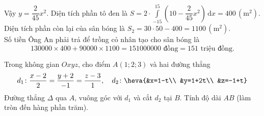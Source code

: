 \begin{ex}
{{}
		\noindent
		Vậy $y=\dfrac{2}{45}x^2$. Diện tích phần tô đen là $S=2 \cdot \displaystyle\int\limits_{-15}^{15} \left(10-\dfrac{2}{45}x^2 \right) \mathrm{\,d}x=400 \, (\text{m}^2)$.\\
		Diện tích phần còn lại của sân bóng là $S_2=30 \cdot 50-400=1100\,(\text{m}^2).$\\
		Số tiền Ông An phải trả để trồng cỏ nhân tạo cho sân bóng là
		$$130000\times 400+90000\times 1100=151000000\text{ đồng}=151\text{ triệu đồng.}$$}
\end{ex}

\begin{ex}%
	Trong không gian $Oxyz$, cho điểm $A(1;2;3)$ và hai đường thẳng
	\[d_1 \colon \dfrac{x-2}{2}= \dfrac{y+2}{-1}= \dfrac{z-3}{1},\quad d_2 \colon \heva{&x=1-t\\ &y=1+2t\\ &z=-1+t}\]
	Đường thẳng $\Delta$ qua $A$, vuông góc với $d_1$ và cắt $d_2$ tại $B$. Tính độ dài $AB$ (làm tròn đến hàng phần trăm).
\end{ex}
